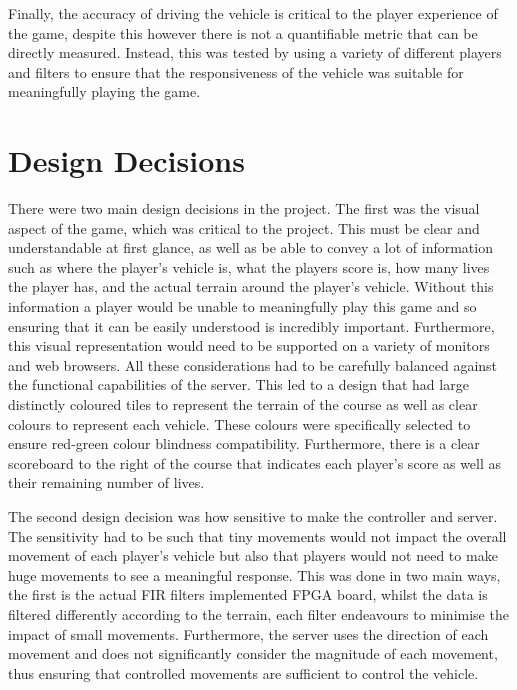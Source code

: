\documentclass[12pt,a4paper]{article}
\begin{document}
 \par
 {\scriptsize Finally, the accuracy of driving the vehicle is critical to the player experience 
 of the game, despite this however there is not a quantifiable metric that can be 
 directly measured. Instead, this was tested by using a variety of different players 
 and filters to ensure that the responsiveness of the vehicle was suitable for 
 meaningfully playing the game.}

\section{\small Design Decisions}

{\scriptsize There were two main design decisions in the project. The first was the visual aspect 
of the game, which was critical to the project. This must be clear and understandable 
at first glance, as well as be able to convey a lot of information such as where the 
player’s vehicle is, what the players score is, how many lives the player has, and 
the actual terrain around the player’s vehicle. Without this information a player 
would be unable to meaningfully play this game and so ensuring that it can be easily 
understood is incredibly important. Furthermore, this visual representation would 
need to be supported on a variety of monitors and web browsers. All these 
considerations had to be carefully balanced against the functional capabilities 
of the server. This led to a design that had large distinctly coloured tiles to 
represent the terrain of the course as well as clear colours to represent each 
vehicle. These colours were specifically selected to ensure red-green colour 
blindness compatibility.  Furthermore, there is a clear scoreboard to the right of 
the course that indicates each player's score as well as their remaining number of lives.}
\par
{\scriptsize The second design decision was how sensitive to make the controller and server. The 
sensitivity had to be such that tiny movements would not impact the overall movement 
of each player’s vehicle but also that players would not need to make huge movements 
to see a meaningful response. This was done in two main ways, the first is the actual 
FIR filters implemented FPGA board, whilst the data is filtered differently according 
to the terrain, each filter endeavours to minimise the impact of small movements. 
Furthermore, the server uses the direction of each movement and does not significantly 
consider the magnitude of each movement, thus ensuring that controlled movements are 
sufficient to control the vehicle. }
\end{document}

